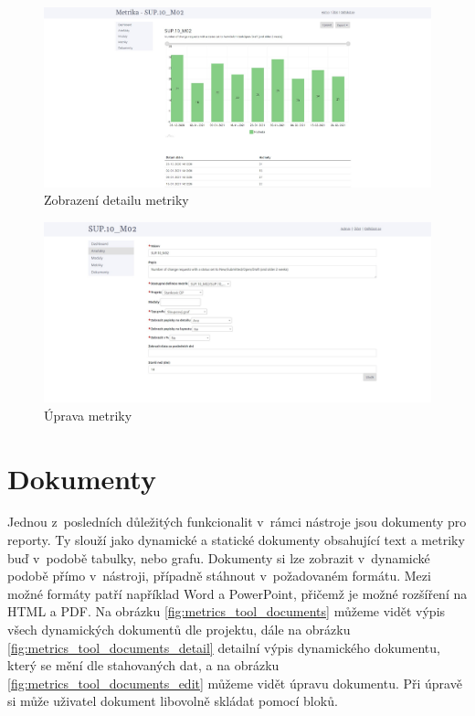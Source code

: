 \documentclass[czech,master]{diploma}
\begin{document}
\begin{figure}[!ht]
    \centering
    \includegraphics[width=1\textwidth]{Diplomka/Figures/metrics_tool/metrics_detail.jpg}
    \caption{Zobrazení detailu metriky}
    \label{fig:metrics_tool_metrics_detail}
\end{figure}


\begin{figure}[!ht]
    \centering
    \includegraphics[width=1\textwidth]{Diplomka/Figures/metrics_tool/metrics_edit.jpg}
    \caption{Úprava metriky}
    \label{fig:metrics_tool_metrics_edit}
\end{figure}
\section{Dokumenty}
Jednou z~posledních důležitých funkcionalit v~rámci nástroje jsou dokumenty pro reporty. Ty slouží jako dynamické a statické dokumenty obsahující text a metriky buď v~podobě tabulky, nebo grafu. Dokumenty si lze zobrazit v~dynamické podobě přímo v~nástroji, případně stáhnout v~požadovaném formátu. Mezi možné formáty patří například Word a PowerPoint, přičemž je možné rozšíření na HTML a PDF. Na obrázku \ref{fig:metrics_tool_documents} můžeme vidět výpis všech dynamických dokumentů dle projektu, dále na obrázku \ref{fig:metrics_tool_documents_detail} detailní výpis dynamického dokumentu, který se mění dle stahovaných dat, a na obrázku \ref{fig:metrics_tool_documents_edit} můžeme vidět úpravu dokumentu. Při úpravě si může uživatel dokument libovolně skládat pomocí bloků. 
\end{document}
